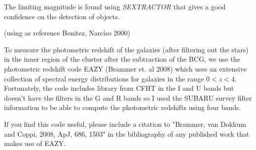 The limiting magnitude is found using \textit{SEXTRACTOR} that gives a good confidence on the detection of objects.

(using as reference Benitez, Narciso 2000)

To measure the photometric redshift of the galaxies (after filtering out the stars) in the inner region of the cluster after the subtraction of the BCG, we use the photometric redshift code EAZY (Brammer et. al 2008) which uses an extensive collection of spectral energy distributions for galaxies in the range $0<z<4$. Fortunately, the code includes library from CFHT in the I and U bands but doesn't have the filters in the G and R bands so I used the SUBARU survey filter information to be able to compute the photometric redshifts using four bands.

If you find this code useful, please include a citation to "Brammer, van Dokkum and Coppi, 2008, ApJ, 686, 1503" in the bibliography of any published work that makes use of EAZY.